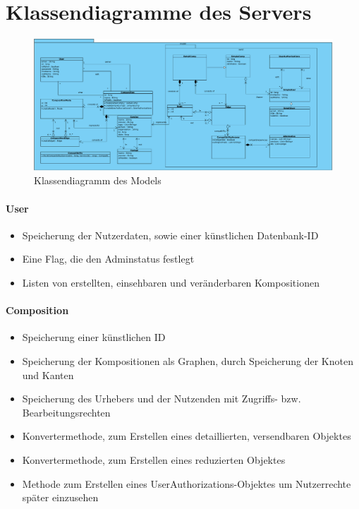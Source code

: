 

\section*{Klassendiagramme des Servers}

\begin{figure}[!h]
	\centering
	\includegraphics[width=\textwidth]{img/Diagramme/Klassen/Model}
	\caption{Klassendiagramm des Models}
	\label{fig:klassendiagramm-model}
\end{figure}

\paragraph{User}
\begin{itemize}
		\item Speicherung der Nutzerdaten, sowie einer künstlichen Datenbank-ID
		\item Eine Flag, die den Adminstatus festlegt
		\item Listen von erstellten, einsehbaren und veränderbaren Kompositionen
\end{itemize}

\paragraph{Composition}
\begin{itemize}
	\item Speicherung einer künstlichen ID
	\item Speicherung der Kompositionen als Graphen, durch Speicherung der Knoten und Kanten
	\item Speicherung des Urhebers und der Nutzenden mit Zugriffs- bzw. Bearbeitungsrechten
	\item Konvertermethode, zum Erstellen eines detaillierten, versendbaren Objektes
	\item Konvertermethode, zum Erstellen eines reduzierten Objektes
	\item Methode zum Erstellen eines UserAuthorizations-Objektes um Nutzerrechte später einzusehen
\end{itemize} 


